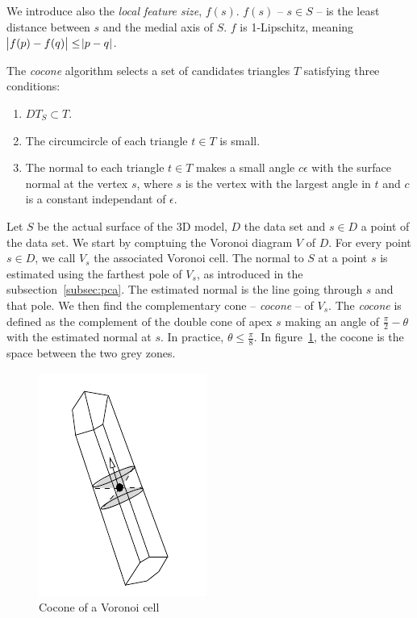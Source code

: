 \documentclass[a4paper]{article}
\begin{document}
We introduce also the \emph{local feature size}, $f(s)$. $f(s)$ -- $s \in S$ -- is the least distance between $s$ and the medial axis of $S$. $f$ is 1-Lipschitz, meaning $\abs{f(p) - f(q)}\le\abs{p - q}$.

The \emph{cocone} algorithm selects a set of candidates triangles $T$ satisfying three conditions:
\begin{enumerate}
\item $DT_S \subset T$.
\item The circumcircle of each triangle $t \in T$ is small.
\item The normal to each triangle $t \in T$ makes a small angle $c\epsilon$ with the surface normal at the vertex $s$, where $s$ is the vertex with the largest angle in $t$ and $c$ is a constant independant of $\epsilon$.
\end{enumerate}

Let $S$ be the actual surface of the 3D model, $D$ the data set and $s \in D$ a point of the data set. We start by comptuing the Voronoi diagram $V$ of $D$. For every point $s \in D$, we call $V_s$ the associated Voronoi cell. The normal to $S$ at a point $s$ is estimated using the farthest pole of $V_s$, as introduced in the subsection~\ref{subsec:pca}. The estimated normal is the line going through $s$ and that pole. We then find the complementary cone -- \emph{cocone} -- of $V_s$. The \emph{cocone} is defined as the complement of the double cone of apex $s$ making an angle of $\frac{\pi}{2}-\theta$ with the estimated normal at $s$. In practice, $\theta\le\frac{\pi}{8}$. In figure~\ref{coc}, the cocone is the space between the two grey zones.

\begin{figure}[h]
  \centering
  \includegraphics[scale=0.3]{Cocone.png}
  \caption{\label{coc} Cocone of a Voronoi cell}
\end{figure}
\end{document}
